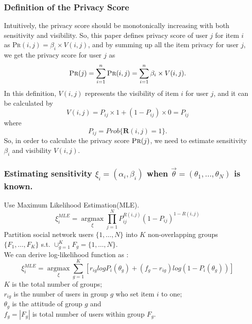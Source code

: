 \documentclass{beamer}
\begin{document}
\begin{frame}[fragile]
  \frametitle{Definition of the Privacy Score}
  Intuitively, the privacy score should be monotonically increasing with
  both sensitivity and visibility. So, this paper defines privacy
  score of user $j$ for item $i$ as \textsc{Pr}$(i,j)=\beta_i\times
  V(i,j)$, and by summing up all the item privacy for user $j$, we get
  the privacy score for user $j$ as
  \[\textsc{Pr}(j)=\sum_{i=1}^{n}\textsc{Pr}(i,j)=\sum_{i=1}^n\beta_i\times V(i,j). \]
 In this definition, $V(i,j)$ represents the visibility of item $i$
 for user $j$, and it can be calculated by
   \[V(i,j)=P_{ij}\times 1 + (1-P_{ij})\times 0 = P_{ij}\]
   where \[P_{ij} = Prob\{\textbf{R}(i,j)=1\}.\]
 So, in order to calculate the privacy score $\textsc{Pr}(j)$, we need
 to estimate sensitivity $\beta_i$ and visibility $V(i,j)$.
\end{frame}

\begin{frame}
  \frametitle{\large{Estimating sensitivity $\xi_i=(\alpha_i,\beta_i)$ when
      $\overrightarrow{\theta}=(\theta_1,\dots,\theta_N)$ is known.}}
  \begin{block}
      {Use Maximum Likelihood Estimation(MLE).}
      \[\xi_i^{MLE}=\underset{\xi}{\operatorname{\arg\max}}
      {\prod_{j=1}^NP_{ij}^{R(i,j)}(1-P_{ij})^{1-R(i,j)}}\]
      Partition social network users $\{1,\dots,N\}$ into $K$
      non-overlapping groups $\{F_1,\ldots,F_K\}$ s.t. $\cup_{g=1}^KF_g=\{1,\ldots,N\}$. \\ 
      We can derive log-likelihood function as : 
      \[\xi_i^{MLE}=\underset{\xi}{\operatorname{\arg\max}}
      {\sum_{g=1}^K[r_{ig}logP_i(\theta_g)+(f_g-r_{ig})log(1-P_i(\theta_g))]}\]
      $K$ is the total number of groups; \\
      $r_{ig}$ is the number of users in group $g$ who set item $i$ to one; \\
      $\theta_g$ is the attitude of group $g$ and \\
      $f_g=|F_g|$ is total number of users within group $F_g$.
  \end{block}
\end{frame}
\end{document}
